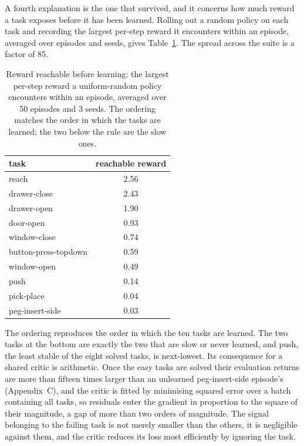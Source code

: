\documentclass[letterpaper, 10 pt, conference]{ieeeconf}
\begin{document}
A fourth explanation is the one that survived, and it concerns how much reward a task
exposes before it has been learned. Rolling out a random policy on each task and recording
the largest per-step reward it encounters within an episode, averaged over episodes and
seeds, gives Table~\ref{tab:reward}. The spread across the suite is a factor of 85.

\begin{table}[tb]
\caption{Reward reachable before learning: the largest per-step reward a uniform-random
policy encounters within an episode, averaged over 50 episodes and 3 seeds. The ordering
matches the order in which the tasks are learned; the two below the rule are the slow ones.}
\label{tab:reward}
\vspace{-0.2cm}
\begin{center}
\small
\begin{tabular}{lc}
\toprule
task & reachable reward \\
\midrule
reach                & 2.56 \\
drawer-close         & 2.43 \\
drawer-open          & 1.90 \\
door-open            & 0.93 \\
window-close         & 0.74 \\
button-press-topdown & 0.59 \\
window-open          & 0.49 \\
push                 & 0.14 \\
\midrule
pick-place           & 0.04 \\
peg-insert-side      & 0.03 \\
\bottomrule
\end{tabular}
\vspace{-0.7cm}
\end{center}
\end{table}

The ordering reproduces the order in which the ten tasks are learned. The two tasks at
the bottom are exactly the two that are slow or never learned, and push, the least stable of
the eight solved tasks, is next-lowest. Its consequence for a
shared critic is arithmetic. Once the easy tasks are solved their evaluation returns are
more than fifteen times larger than an unlearned peg-insert-side episode's (Appendix~C), and
the critic is fitted by minimising squared error over a batch containing all tasks, so
residuals enter the gradient in proportion to the square of their magnitude, a gap of more
than two orders of magnitude. The signal belonging to the
failing task is not merely smaller than the others, it is negligible against them, and the
critic reduces its loss most efficiently by ignoring the task.
\end{document}
